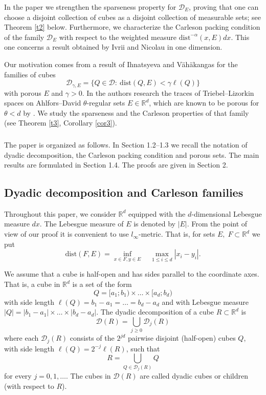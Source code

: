 \documentclass[12pt]{amsart} \setlength{\textwidth}{15cm} \setlength{\textheight}{24cm} \setlength{\voffset}{-1cm} \setlength{\oddsidemargin}{-0.4cm} \setlength{\evensidemargin}{-0.4cm}
\theoremstyle{definition}
\theoremstyle{remark}
\newcommand{\rd}{\mathbb{R}^d}
\begin{document}
  
  In the paper  we  strengthen   the sparseness  property for  $\mathcal{D}_E$,  proving that  one can choose a  disjoint collection   of  cubes as a  disjoint collection of measurable sets; see Theorem \ref{t2} below.
Furthermore, we   characterize the  Carleson packing condition of the family $\mathcal{D}_E$ with respect to the weighted measure
 $\mathrm{dist}^{-\alpha }(x, E)dx $. This one concerns a result obtained by Ivrii and Nicolau \cite[Lemma 3.1]{IN} in one dimension.
    
     

    Our motivation comes from   a result  of Ihnatsyeva and V\"{a}h\"{a}kangas \cite[Theorem 2.10]{IV}  for the families      of cubes
\[\mathcal{D}_{\gamma, E}=\{Q \in \mathcal{D}: \:\mathrm{dist} (Q, E)< \gamma \ell(Q)\} \]
with porous   $E$ and  $\gamma >0$. In  \cite{IV} the authors research the  traces of  Triebel--Lizorkin spaces on  Ahlfors--David $\theta$-regular sets $E \in \rd$, which are known to be porous  for   $\theta < d$  by \cite{Mat}.
We study the sparseness and the Carleson properties of  that family (see Theorem \ref{t3},  Corollary \ref{cor3}).
    



\subsubsection{}
The paper is organized as follows. In Section 1.2--1.3 we recall the notation of dyadic decomposition,    the Carleson packing condition and porous sets.  The main results are formulated in Section 1.4.   The proofs are given  in Section 2.





 \subsection{Dyadic decomposition and Carleson families}
 Throughout this paper, we consider $\rd$ equipped with  the
$d$-dimensional Lebesgue  measure $dx$.    The Lebesgue  measure of $E$ is denoted by $|E|$.
  From the point of view of our proof it is convenient to use  $l_{\infty}$-metric.
   That is, for sets $E,\; F \subset \rd$ we put
   \[\mathrm{dist} (F, E)= \inf_{ x\in F,
  y \in E} \quad \max_{1\leq i \leq d} |x_i-y_i|. \]

We assume that a  cube is half-open and has sides parallel to the
coordinate axes. That is, a cube in $\rd$ is a set of the form
\[Q = [a_1; b_1)\times \dots   \times [a_d; b_d)\]
with side length $\ell(Q) = b_1-a_1 = \dots = b_d-a_d$ and with Lebesgue  measure $|Q|=|b_1-a_1|\times \dots   \times |b_d-a_d|$.
The dyadic decomposition of a cube $R\subset \rd$ is
\[ \mathcal{D}(R)= \bigcup_{j\geq 0} \mathcal{D}_j(R)\]
where each $\mathcal{D}_j(R)$ consists of the $2^{jd}$  pairwise disjoint (half-open) cubes $Q$, with side length
$\ell(Q) = 2^{-j}\ell(R)$, such that
\[R= \bigcup_{Q \in \mathcal{D}_j(R)} Q\]
for every $j =0,1, \dots $. The cubes in  $\mathcal{D}(R)$ are called dyadic cubes or children (with respect to $R$).
\end{document}
